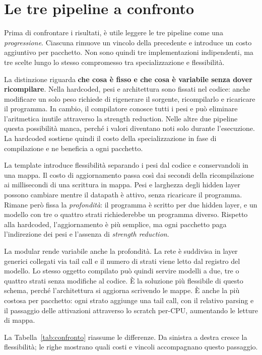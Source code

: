 \documentclass[binding=0.6cm,italian,oneside,noexaminfo]{sapthesis}
\begin{document}
\section{Le tre pipeline a confronto}
\label{sec:confronto}

Prima di confrontare i risultati, è utile leggere le tre pipeline come una \emph{progressione}. Ciascuna rimuove un vincolo della precedente e introduce un costo aggiuntivo per pacchetto. Non sono quindi tre implementazioni indipendenti, ma tre scelte lungo lo stesso compromesso tra specializzazione e flessibilità.

La distinzione riguarda \textbf{che cosa è fisso e che cosa è variabile senza dover ricompilare}. Nella hardcoded, pesi e architettura sono fissati nel codice: anche modificare un solo peso richiede di rigenerare il sorgente, ricompilarlo e ricaricare il programma. In cambio, il compilatore conosce tutti i pesi e può eliminare l'aritmetica inutile attraverso la strength reduction. Nelle altre due pipeline questa possibilità manca, perché i valori diventano noti solo durante l'esecuzione. La hardcoded sostiene quindi il costo della specializzazione in fase di compilazione e ne beneficia a ogni pacchetto.

La template introduce flessibilità separando i pesi dal codice e conservandoli in una mappa. Il costo di aggiornamento passa così dai secondi della ricompilazione ai millisecondi di una scrittura in mappa. Pesi e larghezza degli hidden layer possono cambiare mentre il datapath è attivo, senza ricaricare il programma. Rimane però fissa la \emph{profondità}: il programma è scritto per due hidden layer, e un modello con tre o quattro strati richiederebbe un programma diverso. Rispetto alla hardcoded, l'aggiornamento è più semplice, ma ogni pacchetto paga l'indirezione dei pesi e l'assenza di \emph{strength reduction}.

La modular rende variabile anche la profondità. La rete è suddivisa in layer generici collegati via tail call e il numero di strati viene letto dal registro del modello. Lo stesso oggetto compilato può quindi servire modelli a due, tre o quattro strati senza modifiche al codice. È la soluzione più flessibile di questo schema, perché l'architettura si aggiorna scrivendo le mappe. È anche la più costosa per pacchetto: ogni strato aggiunge una tail call, con il relativo parsing e il passaggio delle attivazioni attraverso lo scratch per-CPU, aumentando le letture di mappa.

La Tabella~\ref{tab:confronto} riassume le differenze. Da sinistra a destra cresce la flessibilità; le righe mostrano quali costi e vincoli accompagnano questo passaggio.
\end{document}
